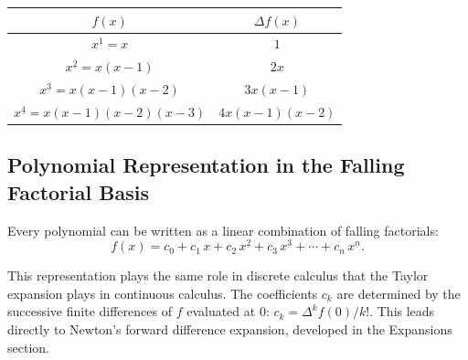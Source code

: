 \begin{center}
\renewcommand{\arraystretch}{1.4}
\begin{tabular}{c|c}
\(f(x)\) & \(\Delta f(x)\) \\
\hline
\(x^{\underline{1}} = x\) & \(1\) \\
\(x^{\underline{2}} = x(x-1)\) & \(2x\) \\
\(x^{\underline{3}} = x(x-1)(x-2)\) & \(3x(x-1)\) \\
\(x^{\underline{4}} = x(x-1)(x-2)(x-3)\) & \(4x(x-1)(x-2)\)
\end{tabular}
\end{center}

\subsection*{Polynomial Representation in the Falling Factorial Basis}

Every polynomial can be written as a linear combination of falling
factorials:
\[
f(x)
=
c_0
+ c_1\, x
+ c_2\, x^{\underline{2}}
+ c_3\, x^{\underline{3}}
+ \cdots
+ c_n\, x^{\underline{n}}.
\]

\begin{remark*}
This representation plays the same role in discrete calculus that the
Taylor expansion plays in continuous calculus. The coefficients \(c_k\)
are determined by the successive finite differences of \(f\) evaluated
at \(0\): \(c_k = \Delta^k f(0) / k!\). This leads directly to Newton's
forward difference expansion, developed in the Expansions section.
\end{remark*}
